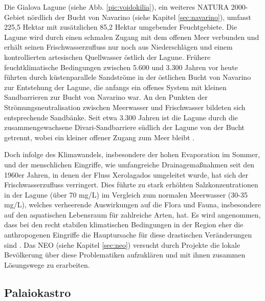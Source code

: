 \documentclass[preprint]{geomorphica} %
\begin{document}
Die Gialova Lagune (siehe Abb. \ref{pic:voidokilia}), ein weiteres NATURA 2000-Gebiet nördlich der Bucht von Navarino (siehe Kapitel \ref{sec:navarino}), umfasst 225,5 Hektar mit zusätzlichen 85,2 Hektar umgebender Feuchtgebiete. Die Lagune wird durch einen schmalen Zugang mit dem offenen Meer verbunden und erhält seinen Frischwasserzufluss nur noch aus Niederschlägen und einem kontrollierten artesischen Quellwasser östlich der Lagune. Frühere feuchtklimatische Bedingungen zwischen 5.600 und 3.300 Jahren vor heute führten durch küstenparallele Sandströme in der östlichen Bucht von Navarino zur Entstehung der Lagune, die anfangs ein offenes System mit kleinen Sandbarrieren zur Bucht von Navarino war. An den Punkten der Strömungsneutralisation zwischen Meerwasser und Frischwasser bildeten sich entsprechende Sandbänke. Seit etwa 3.300 Jahren ist die Lagune durch die zusammengewachsene Divari-Sandbarriere südlich der Lagune von der Bucht getrennt, wobei ein kleiner offener Zugang zum Meer bleibt \cite{emmanouilidisMiddleLateHolocene2018, Maneas.Makopoulou.ea2019}. 

Doch infolge des Klimawandels, insbesondere der hohen Evaporation im Sommer, und der menschlichen Eingriffe, wie umfangreiche Drainagemaßnahmen seit den 1960er Jahren, in denen der Fluss Xerolagados umgeleitet wurde, hat sich der Frischwasserzufluss verringert. Dies führte zu stark erhöhten Salzkonzentrationen in der Lagune (über 70 mg/L) im Vergleich zum normalen Meerwasser (30-35 mg/L), welches verheerende Auswirkungen auf die Flora und Fauna, insbesondere auf den aquatischen Lebensraum für zahlreiche Arten, hat. Es wird angenommen, dass bei den recht stabilen klimatischen Bedingungen in der Region eher die anthropogenen Eingriffe die Hauptursache für diese drastischen Veränderungen sind \cite{Maneas.Makopoulou.ea2019, avramidisDepositionalEnvironmentsSediment2015}. Das NEO (siehe Kapitel \ref{sec:neo}) versucht durch Projekte die lokale Bevölkerung über diese Problematiken aufzuklären und mit ihnen zusammen Lösungswege zu erarbeiten.

\subsection{Palaiokastro}
\label{sec:palaiokastro}
\end{document}

